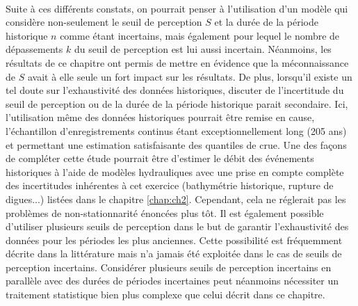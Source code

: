 	\paragraph{} Suite à ces différents constats, on pourrait penser à l'utilisation d'un modèle qui considère non-seulement le seuil de perception $S$ et la durée de la période historique $n$ comme étant incertains, mais également pour lequel le nombre de dépassements $k$ du seuil de perception est lui aussi incertain. Néanmoins, les résultats de ce chapitre ont permis de mettre en évidence que la méconnaissance de $S$ avait à elle seule un fort impact sur les résultats. De plus, lorsqu'il existe un tel doute sur l'exhaustivité des données historiques, discuter de l'incertitude du seuil de perception ou de la durée de la période historique parait secondaire. Ici, l'utilisation même des données historiques pourrait être remise en cause, l'échantillon d'enregistrements continus étant exceptionnellement long (205 ans) et permettant une estimation satisfaisante des quantiles de crue. Une des façons de compléter cette étude pourrait être d'estimer le débit des événements historiques à l'aide de modèles hydrauliques avec une prise en compte complète des incertitudes inhérentes à cet exercice (bathymétrie historique, rupture de digues...) listées dans le chapitre \ref{chap:ch2}. Cependant, cela ne réglerait pas les problèmes de non-stationnarité énoncées plus tôt. Il est également possible d'utiliser plusieurs seuils de perception dans le but de garantir l'exhaustivité des données pour les périodes les plus anciennes. Cette possibilité est fréquemment décrite dans la littérature mais n'a jamais été exploitée dans le cas de seuils de perception incertains. Considérer plusieurs seuils de perception incertains en parallèle avec des durées de périodes incertaines peut néanmoins nécessiter un traitement statistique bien plus complexe que celui décrit dans ce chapitre.
	

